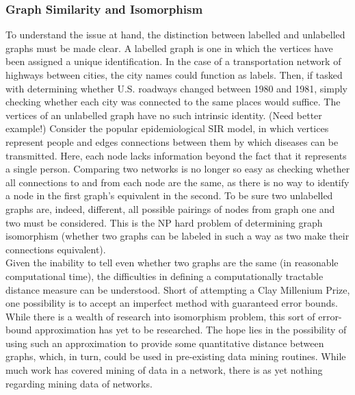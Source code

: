 \documentclass[11pt]{article}
\begin{document}
\subsubsection{Graph Similarity and Isomorphism}
To understand the issue at hand, the distinction between labelled and unlabelled graphs must be made clear. A labelled graph is one in which the vertices have been assigned a unique identification. In the case of a transportation network of highways between cities, the city names could function as labels. Then, if tasked with determining whether U.S. roadways changed between 1980 and 1981, simply checking whether each city was connected to the same places would suffice. The vertices of an unlabelled graph have no such intrinsic identity. (Need better example!) Consider the popular epidemiological SIR model, in which vertices represent people and edges connections between them by which diseases can be transmitted. Here, each node lacks information beyond the fact that it represents a single person. Comparing two networks is no longer so easy as checking whether all connections to and from each node are the same, as there is no way to identify a node in the first graph's equivalent in the second. To be sure two unlabelled graphs are, indeed, different, all possible pairings of nodes from graph one and two must be considered. This is the NP hard problem of determining graph isomorphism (whether two graphs can be labeled in such a way as two make their connections equivalent).\vspace{1mm}\\
Given the inability to tell even whether two graphs are the same (in reasonable computational time), the difficulties in defining a computationally tractable distance measure can be understood. Short of attempting a Clay Millenium Prize, one possibility is to accept an imperfect method with guaranteed error bounds. While there is a wealth of research into isomorphism problem, this sort of error-bound approximation has yet to be researched. The hope lies in the possibility of using such an approximation to provide some quantitative distance between graphs, which, in turn, could be used in pre-existing data mining routines. While much work has covered mining of data in a network, there is as yet nothing regarding mining data of networks. 
\end{document}
